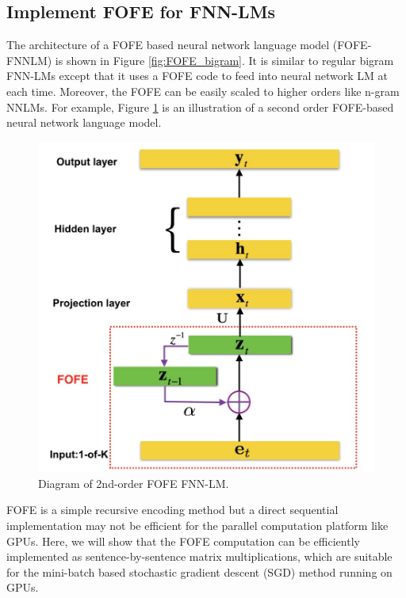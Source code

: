 \documentclass[11pt]{article}
\begin{document}
\subsection{Implement FOFE for FNN-LMs}

The architecture of a FOFE based neural network language model (FOFE-FNNLM) is shown in Figure \ref{fig:FOFE_bigram}.  It is similar to regular bigram FNN-LMs except that it uses a FOFE code  
to feed into neural network LM at each time.
Moreover, the FOFE can be easily scaled to higher orders like n-gram NNLMs.
For example,  Figure \ref{fig:FOFE_trigram} is an illustration of a second order FOFE-based neural network language model.
\begin{figure}[t]
	\centering
	\includegraphics[width=0.8\linewidth]{FOFE_trigram.png}
	\caption{Diagram of 2nd-order FOFE FNN-LM.}
	\label{fig:FOFE_trigram}
\end{figure}

FOFE is a simple recursive encoding method but a direct sequential implementation may not be efficient for the parallel computation platform like GPUs. 
Here, we will show that the FOFE computation can be efficiently implemented as sentence-by-sentence matrix multiplications, which are suitable for the mini-batch based stochastic gradient descent (SGD) method running on GPUs. 
\end{document}
